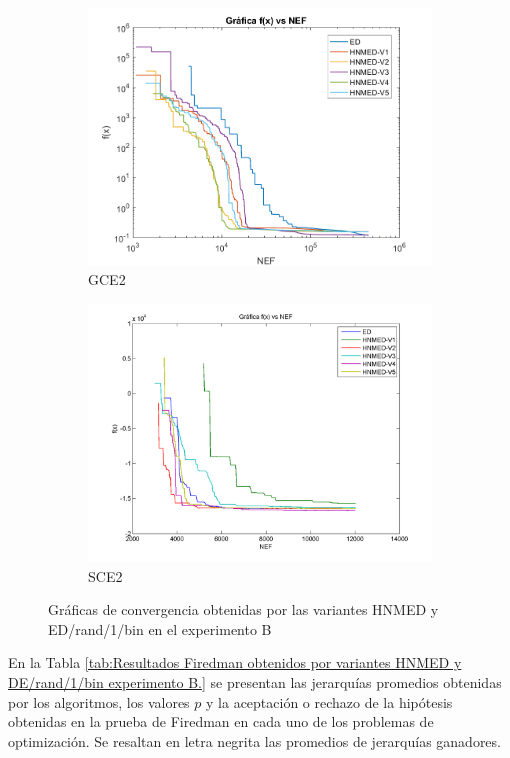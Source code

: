 \begin{figure}
\begin{subfigure}[b]{0.49\linewidth}
		\includegraphics[width=\linewidth]{Figures/B-Grafica_Convergencia_Problema_5}
		\caption{GCE2} \label{fig:G2} 
	\end{subfigure}
	\begin{subfigure}[b]{0.49\linewidth}
		\includegraphics[width=\linewidth]{Figures/B-Grafica_Convergencia_Problema_6}
		\caption{SCE2} \label{fig:S1} 
	\end{subfigure}
	\caption{Gráficas de convergencia obtenidas por las variantes HNMED y ED/rand/1/bin en el experimento B} \label{fig: Gráficas de convergencia para las variantes HNMED y ED/rand/1/bin} 
	
\end{figure}
En la Tabla \ref{tab:Resultados Firedman obtenidos por variantes HNMED y DE/rand/1/bin  experimento B.} se presentan las jerarquías promedios obtenidas por los algoritmos, los valores $p$ y la aceptación o rechazo de la hipótesis obtenidas en la prueba de Firedman en cada uno de los problemas de optimización. Se resaltan en letra negrita las promedios de jerarquías ganadores.

